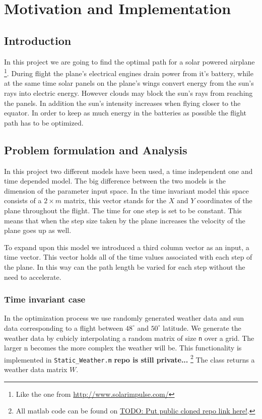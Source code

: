 \documentclass[ twoside,openright,titlepage,numbers=noenddot,headinclude,%
                footinclude=true,cleardoublepage=empty,abstractoff, %
                BCOR=5mm,paper=a4,fontsize=11pt,%
                ngerman,american,%
                ]{scrreprt}
\begin{document}
\frenchspacing
\raggedbottom
{} %
\pagestyle{plain}

%
\pagestyle{scrheadings}



\chapter{Motivation and Implementation}
\section{Introduction}
In this project we are going to find the optimal path for a solar powered airplane \footnote{Like the one from \url{http://www.solarimpulse.com/}}. During flight the plane's electrical engines drain power from it's battery, while at the same time solar panels on the plane's wings convert energy from the sun's rays into electric energy. However clouds may block the sun's rays from reaching the panels. In addition the sun's intensity increases when flying closer to the equator. In order to keep as much energy in the batteries as possible the flight path has to be optimized.

\section{Problem formulation and Analysis}

In this project two different models have been used, a time independent one and time depended model.
The big difference between the two models is the dimension of the parameter input space.
In the time invariant model this space consists of a $2 \times m $ matrix, this vector stands for the $ X $ and $ Y $ coordinates of the plane throughout the flight.
The time for one step is set to be constant.
This means that when the step size taken by the plane increases the velocity of the plane goes up as well.

To expand upon this model we introduced a third column vector as an input, a time vector.
This vector holds all of the time values associated with each step of the plane.
In this way can the path length be varied for each step without the need to accelerate.  


\subsection{Time invariant case}
In the optimization process we use randomly generated weather data and sun data corresponding to a flight between $48^\circ$ and $50^\circ$ latitude. We generate the weather data by cubicly interpolating a random matrix of size \texttt{n} over a grid. The larger n becomes the more complex the weather will be. This functionality is implemented in \texttt{Static\_Weather.m} \textbf{repo is still private...} \footnote{All matlab code can be found on \url{TODO: Put public cloned repo link here!}.} The class returns a weather data matrix $W$.
\end{document}
